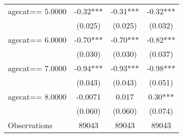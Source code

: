 {\begin{tabular}{l*{3}{c}}
\addlinespace
agecat==     5.0000&    -0.32***&    -0.31***&    -0.32***\\
                &  (0.025)   &  (0.025)   &  (0.032)   \\
\addlinespace
agecat==     6.0000&    -0.70***&    -0.70***&    -0.82***\\
                &  (0.030)   &  (0.030)   &  (0.037)   \\
\addlinespace
agecat==     7.0000&    -0.94***&    -0.93***&    -0.98***\\
                &  (0.043)   &  (0.043)   &  (0.051)   \\
\addlinespace
agecat==     8.0000&  -0.0071   &    0.017   &     0.30***\\
                &  (0.060)   &  (0.060)   &  (0.074)   \\
\midrule
Observations    &    89043   &    89043   &    89043   \\
\bottomrule
\end{tabular}
}
